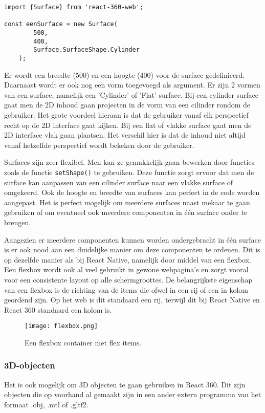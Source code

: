 \begin{lstlisting}[frame=single, caption=Voorbeeld van een surface]
import {Surface} from 'react-360-web';

const eenSurface = new Surface(
		500,
		400,
		Surface.SurfaceShape.Cylinder
	);
\end{lstlisting}

Er wordt een breedte (500) en een hoogte (400) voor de surface gedefinieerd. Daarnaast wordt er ook nog een vorm toegevoegd als argument. Er zijn 2 vormen van een surface, namelijk een 'Cylinder' of 'Flat' surface. Bij een cylinder surface gaat men de 2D inhoud gaan projecten in de vorm van een cilinder rondom de gebruiker. Het grote voordeel hieraan is dat de gebruiker vanaf elk perspectief recht op de 2D interface gaat kijken. Bij een flat of vlakke surface gaat men de 2D interface vlak gaan plaatsen. Het verschil hier is dat de inhoud niet altijd vanaf hetzelfde perspectief wordt bekeken door de gebruiker.

Surfaces zijn zeer flexibel. Men kan ze gemakkelijk gaan bewerken door functies zoals de functie \lstinline[basicstyle=\ttfamily\color{red}]|setShape()| te gebruiken. Deze functie zorgt ervoor dat men de surface kan aanpassen van een cilinder surface naar een vlakke surface of omgekeerd. Ook de hoogte en breedte van surfaces kan perfect in de code worden aangepast. Het is perfect mogelijk om meerdere surfaces naast mekaar te gaan gebruiken of om eventueel ook meerdere componenten in één surface onder te brengen. 

Aangezien er meerdere componenten kunnen worden ondergebracht in één surface is er ook nood aan een duidelijke manier om deze componenten te ordenen. Dit is op dezelfde manier als bij React Native, namelijk door middel van een flexbox. Een flexbox wordt ook al veel gebruikt in gewone webpagina's en zorgt vooral voor een consistente layout op alle schermgroottes. De belangrijkste eigenschap van een flexbox is de richting van de items die ofwel in een rij of een in kolom geordend zijn. Op het web is dit standaard een rij, terwijl dit bij React Native en React 360 standaard een kolom is.

\begin{figure}[h]
	\centering
	\texttt{[image: flexbox.png]}
	\caption{Een flexbox container met flex items.}
	\label{fig:flexbox}
\end{figure}

\subsubsection{3D-objecten}
\label{ssubsec:3d-objecten}
Het is ook mogelijk om 3D objecten te gaan gebruiken in React 360. Dit zijn objecten die op voorhand al gemaakt zijn in een ander extern programma van het formaat .obj, .mtl of .gltf2.

